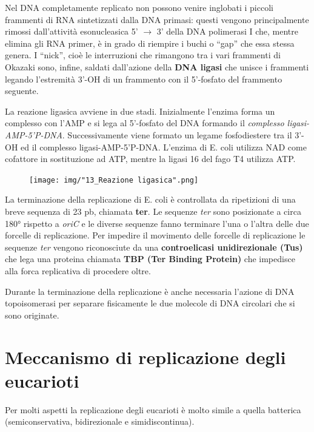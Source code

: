 \documentclass[11pt]{book}
\begin{document}
Nel DNA completamente replicato non possono venire inglobati i piccoli
frammenti di RNA sintetizzati dalla DNA primasi: questi vengono
principalmente rimossi dall'attività esonucleasica 5' \(\rightarrow\) 3'
della DNA polimerasi I che, mentre elimina gli RNA primer, è in grado di
riempire i buchi o ``gap'' che essa stessa genera. I ``nick'', cioè le
interruzioni che rimangono tra i vari frammenti di Okazaki sono, infine,
saldati dall'azione della \textbf{DNA ligasi} che unisce i frammenti
legando l'estremità 3'-OH di un frammento con il 5'-fosfato del
frammento seguente.

La reazione ligasica avviene in due stadi. Inizialmente l'enzima forma
un complesso con l'AMP e si lega al 5'-fosfato del DNA formando il
\emph{complesso ligasi-AMP-5'P-DNA}. Successivamente viene formato un
legame fosfodiestere tra il 3'-OH ed il complesso ligasi-AMP-5'P-DNA.
L'enzima di E. coli utilizza NAD come cofattore in sostituzione ad ATP,
mentre la ligasi 16 del fago T4 utilizza ATP.

\clearpage
\begin{figure}[htp]
\centering
\texttt{[image: img/"13\_Reazione ligasica".png]}
\caption{}
\label{replicazione-ligasica}
\end{figure}

La terminazione della replicazione di E. coli è controllata da
ripetizioni di una breve sequenza di 23 pb, chiamata \textbf{ter}. Le
sequenze \emph{ter} sono posizionate a circa 180° rispetto a \emph{oriC}
e le diverse sequenze fanno terminare l'una o l'altra delle due forcelle
di replicazione. Per impedire il movimento delle forcelle di
replicazione le sequenze \emph{ter} vengono riconosciute da una
\textbf{controelicasi unidirezionale (Tus)} che lega una proteina
chiamata \textbf{TBP (Ter Binding Protein)} che impedisce alla forca
replicativa di procedere oltre.

Durante la terminazione della replicazione è anche necessaria l'azione
di DNA topoisomerasi per separare fisicamente le due molecole di DNA
circolari che si sono originate.

\section{Meccanismo di replicazione degli
eucarioti}\label{meccanismo-di-replicazione-degli-eucarioti}

Per molti aspetti la replicazione degli eucarioti è molto simile a
quella batterica (semiconservativa, bidirezionale e simidiscontinua).
\end{document}
